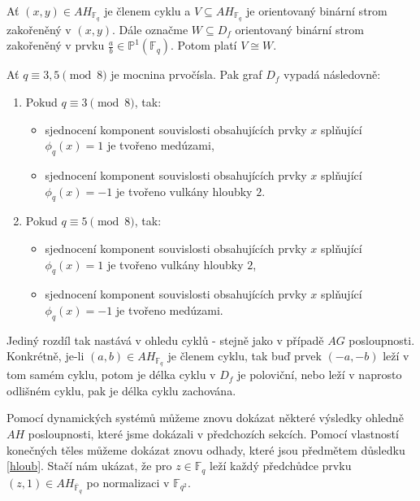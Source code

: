 \documentclass[12pt]{report}
\begin{document}
\begin{dusledek}
Ať $(x,y) \in AH_{\mathbb{F}_q}$ je členem cyklu a $V \subseteq AH_{\mathbb{F}_q}$ je orientovaný binární strom zakořeněný v $(x,y)$. Dále označme $W \subseteq D_f$ orientovaný binární strom zakořeněný v prvku $\frac{a}{b} \in \mathbb{P}^{1}(\mathbb{F}_q)$. Potom platí $V \cong W$.
\end{dusledek}
\begin{dusledek}
Ať $q \equiv 3,5 \pmod{8}$ je mocnina prvočísla. Pak graf $D_f$ vypadá následovně:
\begin{enumerate}
\item Pokud $q \equiv 3 \pmod{8}$, tak:
\begin{itemize}
\item sjednocení komponent souvislosti obsahujících prvky $x$ splňující $\phi_q(x) = 1$ je tvořeno medúzami,
\item sjednocení komponent souvislosti obsahujících prvky $x$ splňující $\phi_q(x) = -1$ je tvořeno vulkány hloubky $2$.
\end{itemize}
\item Pokud $q \equiv 5 \pmod{8}$, tak:
\begin{itemize}
\item sjednocení komponent souvislosti obsahujících prvky $x$ splňující $\phi_q(x) = 1$ je tvořeno vulkány hloubky $2$,
\item sjednocení komponent souvislosti obsahujících prvky $x$ splňující $\phi_q(x) = -1$ je tvořeno medúzami.
\end{itemize}
\end{enumerate}
\end{dusledek}

 Jediný rozdíl tak nastává v ohledu cyklů - stejně jako v případě $AG$ posloupnosti. Konkrétně, je-li $(a,b) \in AH_{\mathbb{F}_q}$ je členem cyklu, tak buď prvek $(-a,-b)$ leží v tom samém cyklu, potom je délka cyklu v $D_f$ je poloviční, nebo leží v naprosto odlišném cyklu, pak je délka cyklu zachována.

Pomocí dynamických systémů můžeme znovu dokázat některé výsledky ohledně $AH$ posloupnosti, které jsme dokázali v předchozích sekcích. Pomocí vlastností konečných těles můžeme dokázat znovu odhady, které jsou předmětem důsledku \ref{hloub}. Stačí nám ukázat, že pro $z \in \mathbb{F}_q$ leží každý předchůdce prvku $(z,1) \in AH_{\overline{\mathbb{F}}_q}$ po normalizaci v $\mathbb{F}_{q^2}$. 
\end{document}
